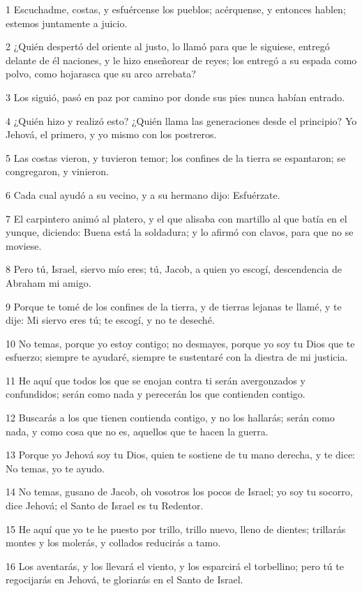 \par 1 Escuchadme, costas, y esfuércense los pueblos; acérquense, y entonces hablen; estemos juntamente a juicio.
\par 2 ¿Quién despertó del oriente al justo, lo llamó para que le siguiese, entregó delante de él naciones, y le hizo enseñorear de reyes; los entregó a su espada como polvo, como hojarasca que su arco arrebata?
\par 3 Los siguió, pasó en paz por camino por donde sus pies nunca habían entrado.
\par 4 ¿Quién hizo y realizó esto? ¿Quién llama las generaciones desde el principio? Yo Jehová, el primero, y yo mismo con los postreros.
\par 5 Las costas vieron, y tuvieron temor; los confines de la tierra se espantaron; se congregaron, y vinieron.
\par 6 Cada cual ayudó a su vecino, y a su hermano dijo: Esfuérzate.
\par 7 El carpintero animó al platero, y el que alisaba con martillo al que batía en el yunque, diciendo: Buena está la soldadura; y lo afirmó con clavos, para que no se moviese.
\par 8 Pero tú, Israel, siervo mío eres; tú, Jacob, a quien yo escogí, descendencia de Abraham mi amigo. 
\par 9 Porque te tomé de los confines de la tierra, y de tierras lejanas te llamé, y te dije: Mi siervo eres tú; te escogí, y no te deseché.
\par 10 No temas, porque yo estoy contigo; no desmayes, porque yo soy tu Dios que te esfuerzo; siempre te ayudaré, siempre te sustentaré con la diestra de mi justicia.
\par 11 He aquí que todos los que se enojan contra ti serán avergonzados y confundidos; serán como nada y perecerán los que contienden contigo.
\par 12 Buscarás a los que tienen contienda contigo, y no los hallarás; serán como nada, y como cosa que no es, aquellos que te hacen la guerra.
\par 13 Porque yo Jehová soy tu Dios, quien te sostiene de tu mano derecha, y te dice: No temas, yo te ayudo.
\par 14 No temas, gusano de Jacob, oh vosotros los pocos de Israel; yo soy tu socorro, dice Jehová; el Santo de Israel es tu Redentor.
\par 15 He aquí que yo te he puesto por trillo, trillo nuevo, lleno de dientes; trillarás montes y los molerás, y collados reducirás a tamo.
\par 16 Los aventarás, y los llevará el viento, y los esparcirá el torbellino; pero tú te regocijarás en Jehová, te gloriarás en el Santo de Israel.
